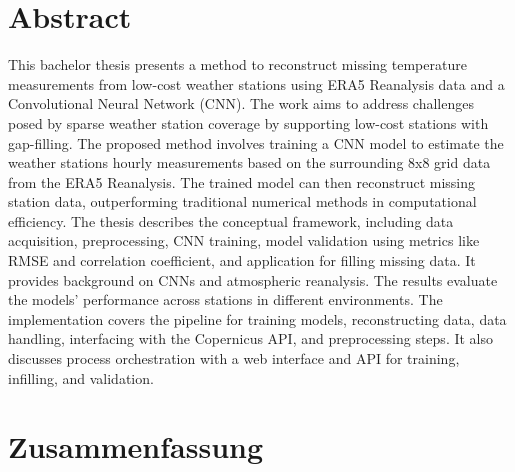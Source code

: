 \section*{Abstract}
\label{sec: abstract}

This bachelor thesis presents a method to reconstruct missing temperature measurements from low-cost weather stations using ERA5 Reanalysis data and a Convolutional Neural Network (CNN).
The work aims to address challenges posed by sparse weather station coverage by supporting low-cost stations with gap-filling.
The proposed method involves training a CNN model to estimate the weather stations hourly measurements based on the surrounding 8x8 grid data from the ERA5 Reanalysis.
The trained model can then reconstruct missing station data, outperforming traditional numerical methods in computational efficiency.
The thesis describes the conceptual framework, including data acquisition, preprocessing, CNN training, model validation using metrics like RMSE and correlation coefficient, and application for filling missing data.
It provides background on CNNs and atmospheric reanalysis.
The results evaluate the models' performance across stations in different environments.
The implementation covers the pipeline for training models, reconstructing data, data handling, interfacing with the Copernicus API, and preprocessing steps.
It also discusses process orchestration with a web interface and API for training, infilling, and validation.

\section*{Zusammenfassung}

